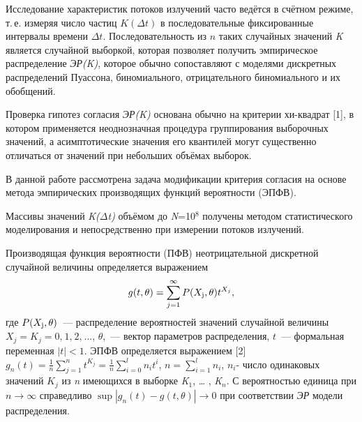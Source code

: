 











Исследование характеристик потоков излучений часто ведётся в счётном режиме,
т.\,е. измеряя число частиц $K(\Delta t)$  в последовательные фиксированные интервалы времени $\Delta t$.
Последовательность из $n$ таких случайных значений \textit{K} является случайной выборкой, которая позволяет получить эмпирическое распределение \textit{ЭР(K)}, которое обычно сопоставляют с моделями дискретных распределений Пуассона, биномиального, отрицательного биномиального и их обобщений.

Проверка гипотез согласия \textit{ЭР(K)} основана обычно на критерии хи-квадрат [1], в котором применяется неоднозначная процедура группирования выборочных значений, а асимптотические значения его квантилей могут существенно отличаться от значений при небольших объёмах выборок.

В данной работе рассмотрена задача модификации критерия согласия на основе метода эмпирических производящих функций вероятности (ЭПФВ).

Массивы значений \textit{K($\Delta$t)} объёмом до \textit{N}=10${}^{8}$ получены методом статистического моделирования и непосредственно при измерении потоков излучений.

Производящая функция вероятности (ПФВ) неотрицательной дискретной случайной величины определяется выражением
\[g(t,\theta )=\sum _{j=1}^{\infty }P(X_{{\rm j}} ,\theta )t^{X_{j} }  ,\]
где $P(X_{{\rm j}} ,\theta )$~--- распределение вероятностей значений случайной величины
$X_{j} =K_{j} =0,_{} 1,_{} 2,_{} ...$, $\theta $,~--- вектор параметров распределения,
$t$~--- формальная переменная $\left|t\right|<1$.
ЭПФВ определяется выражением [2]
$g_{n} (t)=\frac{1}{n} \sum _{j=1}^{n}t^{K_{j} }  =\frac{1}{n} \sum _{i=0}^{l}n_{i} t^{i}  $, $n=\sum _{i=1}^{l}n_{i}  $,  $n_{i} $- число одинаковых значений $K_{j} $ из \textit{n} имеющихся в выборке \textit{K}${}_{1}$,  {\dots} , \textit{K${}_{n}$}. С вероятностью единица при $n\to \infty $ справедливо $\sup \left|g_{n} (t)-g(t,\theta )\right|\to 0$ при соответствии \textit{ЭР} модели распределения.

